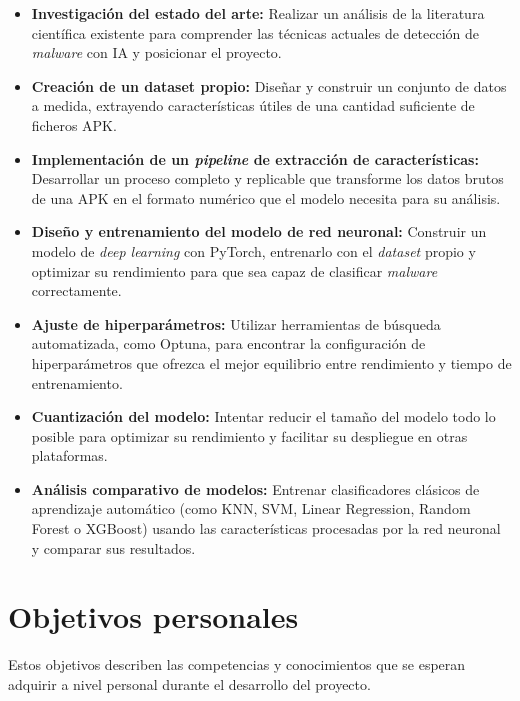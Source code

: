 \begin{itemize}
	\item \textbf{Investigación del estado del arte:} Realizar un análisis de la literatura científica existente para comprender las técnicas actuales de detección de \textit{malware} con IA y posicionar el proyecto.
	
	\item \textbf{Creación de un dataset propio:} Diseñar y construir un conjunto de datos a medida, extrayendo características útiles de una cantidad suficiente de ficheros APK.
	
	\item \textbf{Implementación de un \textit{pipeline} de extracción de características:} Desarrollar un proceso completo y replicable que transforme los datos brutos de una APK en el formato numérico que el modelo necesita para su análisis.
	
	\item \textbf{Diseño y entrenamiento del modelo de red neuronal:} Construir un modelo de \textit{deep learning} con PyTorch, entrenarlo con el \textit{dataset} propio y optimizar su rendimiento para que sea capaz de clasificar \textit{malware} correctamente.
	
	\item \textbf{Ajuste de hiperparámetros:} Utilizar herramientas de búsqueda automatizada, como Optuna, para encontrar la configuración de hiperparámetros que ofrezca el mejor equilibrio entre rendimiento y tiempo de entrenamiento.
	
	\item \textbf{Cuantización del modelo:} Intentar reducir el tamaño del modelo todo lo posible para optimizar su rendimiento y facilitar su despliegue en otras plataformas.
	
	\item \textbf{Análisis comparativo de modelos:} Entrenar clasificadores clásicos de aprendizaje automático (como KNN, SVM, Linear Regression, Random Forest o XGBoost) usando las características procesadas por la red neuronal y comparar sus resultados.
\end{itemize}

\section{Objetivos personales}
Estos objetivos describen las competencias y conocimientos que se esperan adquirir a nivel personal durante el desarrollo del proyecto.

